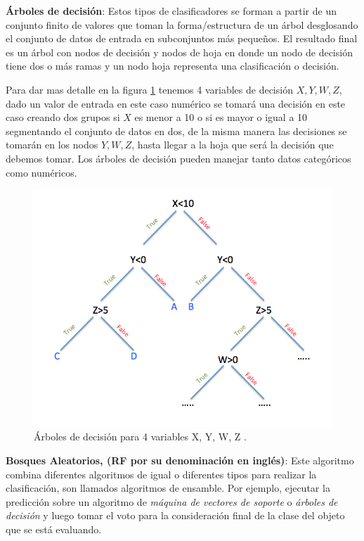 \par \textbf{Árboles de decisión}: Estos tipos de clasificadores se forman a partir de  un conjunto finito de valores  que toman la forma/estructura de un árbol desglosando el conjunto de datos de entrada en subconjuntos más pequeños. El resultado final es un árbol con nodos de decisión y nodos de hoja en donde un nodo de decisión tiene dos o más ramas y un nodo hoja representa una clasificación o decisión. 

Para dar mas detalle en la figura \ref{Fig: decision-tree} tenemos 4 variables de decisión $ X, Y, W, Z$, dado un valor  de entrada en este caso numérico se tomará una decisión en este caso creando dos grupos  si $ X$  es menor a 10 o si es mayor o igual a 10 segmentando el conjunto de datos en dos, de la misma manera las decisiones se tomarán en los nodos $ Y, W, Z$, hasta llegar a la hoja que será la decisión que debemos tomar. Los árboles de decisión pueden manejar tanto datos categóricos como numéricos.

  
\begin{figure}[H]
 \centering
  \includegraphics[scale=0.3,keepaspectratio=true,clip=true]{imagenes/MarcoTeorico/decision-tree.png}
  \caption{Árboles de decisión para 4 variables X, Y, W, Z .}%
  \label{Fig: decision-tree}
\end{figure}


\par \textbf{Bosques Aleatorios, (RF por su denominación en inglés)}: Este  algoritmo combina diferentes algoritmos de igual o diferentes tipos para realizar la clasificación, son llamados algoritmos de ensamble. Por ejemplo, ejecutar la predicción sobre un algoritmo de \textit{máquina de vectores de soporte} o  \textit{árboles de decisión} y luego tomar el voto para la consideración final de la clase del objeto que se está evaluando.  

